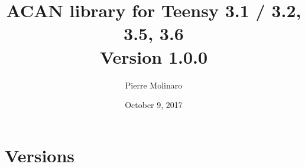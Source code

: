 \documentclass[9pt, a4paper, obeyspaces, openany]{extarticle}
\begin{document}
 


\title{\bf \Huge{ACAN library for Teensy 3.1 / 3.2, 3.5, 3.6\\Version 1.0.0}}
\author{Pierre Molinaro}
\date {October 9, 2017}

\maketitle


\tableofcontents


\section{Versions}
\end{document}
